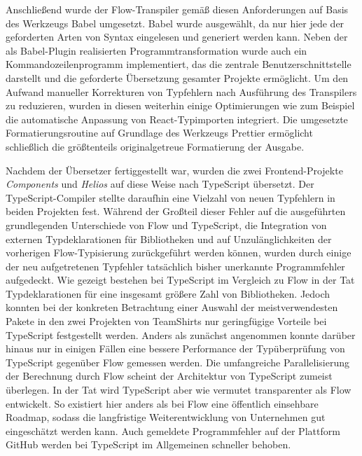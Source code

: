 Anschließend wurde der Flow-Transpiler gemäß diesen Anforderungen auf Basis des Werkzeugs Babel umgesetzt. Babel wurde ausgewählt, da nur hier jede der geforderten Arten von Syntax eingelesen und generiert werden kann. Neben der als Babel-Plugin realisierten Programmtransformation wurde auch ein Kommandozeilenprogramm implementiert, das die zentrale Benutzerschnittstelle darstellt und die geforderte Übersetzung gesamter Projekte ermöglicht. Um den Aufwand manueller Korrekturen von Typfehlern nach Ausführung des Transpilers zu reduzieren, wurden in diesen weiterhin einige Optimierungen wie zum Beispiel die automatische Anpassung von React-Typimporten integriert. Die umgesetzte Formatierungsroutine auf Grundlage des Werkzeugs Prettier ermöglicht schließlich die größtenteils originalgetreue Formatierung der Ausgabe.

Nachdem der Übersetzer fertiggestellt war, wurden die zwei Frontend-Projekte \textit{Components} und \textit{Helios} auf diese Weise nach TypeScript übersetzt. Der TypeScript-Compiler stellte daraufhin eine Vielzahl von neuen Typfehlern in beiden Projekten fest. Während der Großteil dieser Fehler auf die ausgeführten  grundlegenden Unterschiede von Flow und TypeScript, die Integration von externen Typdeklarationen für Bibliotheken und auf Unzulänglichkeiten der vorherigen Flow-Typisierung zurückgeführt werden können, wurden durch einige der neu aufgetretenen Typfehler tatsächlich bisher unerkannte Programmfehler aufgedeckt. Wie gezeigt bestehen bei TypeScript im Vergleich zu Flow in der Tat Typdeklarationen für eine insgesamt größere Zahl von Bibliotheken. Jedoch konnten bei der konkreten Betrachtung einer Auswahl der meistverwendesten Pakete in den zwei Projekten von TeamShirts nur geringfügige Vorteile bei TypeScript festgestellt werden. Anders als zunächst angenommen konnte darüber hinaus nur in einigen Fällen eine bessere Performance der Typüberprüfung von TypeScript gegenüber Flow gemessen werden. Die umfangreiche Parallelisierung der Berechnung durch Flow scheint der Architektur von TypeScript zumeist überlegen. In der Tat wird TypeScript aber wie vermutet transparenter als Flow entwickelt. So existiert hier anders als bei Flow eine öffentlich einsehbare Roadmap, sodass die langfristige Weiterentwicklung von Unternehmen gut eingeschätzt werden kann. Auch gemeldete Programmfehler auf der Plattform GitHub werden bei TypeScript im Allgemeinen schneller behoben.

